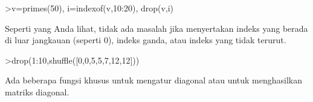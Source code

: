\documentclass[a4paper,10pt]{article}
\begin{document}
\begin{eulernotebook}
\begin{eulercomment}
\begin{eulercomment}
\begin{eulercomment}
\begin{eulercomment}
\begin{eulercomment}
\begin{eulercomment}
\begin{eulercomment}
\begin{eulercomment}
\begin{eulercomment}
\begin{eulercomment}
\begin{eulercomment}
\begin{eulercomment}
\begin{eulercomment}
\begin{eulercomment}
\begin{eulercomment}
\begin{eulercomment}
\begin{eulercomment}
\begin{eulercomment}
\begin{eulercomment}
\end{eulercomment}
\begin{eulerprompt}
>v=primes(50), i=indexof(v,10:20), drop(v,i)
\end{eulerprompt}
\begin{euleroutput}
  [2,  3,  5,  7,  11,  13,  17,  19,  23,  29,  31,  37,  41,  43,  47]
  [0,  5,  0,  6,  0,  0,  0,  7,  0,  8,  0]
  [2,  3,  5,  7,  23,  29,  31,  37,  41,  43,  47]
\end{euleroutput}
\begin{eulercomment}
Seperti yang Anda lihat, tidak ada masalah jika menyertakan indeks
yang berada di luar jangkauan (seperti 0), indeks ganda, atau indeks
yang tidak terurut.
\end{eulercomment}
\begin{eulerprompt}
>drop(1:10,shuffle([0,0,5,5,7,12,12]))
\end{eulerprompt}
\begin{euleroutput}
  [1,  2,  3,  4,  6,  8,  9,  10]
\end{euleroutput}
\begin{eulercomment}
Ada beberapa fungsi khusus untuk mengatur diagonal atau untuk
menghasilkan matriks diagonal.


\end{eulercomment}
\end{eulercomment}
\end{eulercomment}
\end{eulercomment}
\end{eulercomment}
\end{eulercomment}
\end{eulercomment}
\end{eulercomment}
\end{eulercomment}
\end{eulercomment}
\end{eulercomment}
\end{eulercomment}
\end{eulercomment}
\end{eulercomment}
\end{eulercomment}
\end{eulercomment}
\end{eulercomment}
\end{eulercomment}
\end{eulercomment}
\end{eulernotebook}
\end{document}
